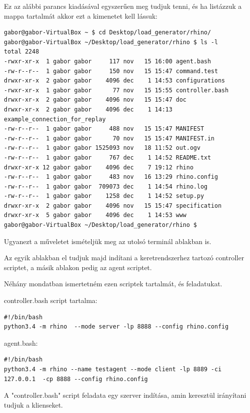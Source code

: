 \documentclass[a4paper,12pt,oneside]{report}
\begin{document}
\begin{enumerate}
Ez az alábbi parancs kiadásával egyszerűen meg tudjuk tenni, és ha listázzuk a mappa tartalmát akkor ezt a kimenetet kell lássuk:

\begin{lstlisting}
gabor@gabor-VirtualBox ~ $ cd Desktop/load_generator/rhino/
gabor@gabor-VirtualBox ~/Desktop/load_generator/rhino $ ls -l
total 2248
-rwxr-xr-x  1 gabor gabor     117 nov   15 16:00 agent.bash
-rw-r--r--  1 gabor gabor     150 nov   15 15:47 command.test
drwxr-xr-x  2 gabor gabor    4096 dec    1 14:53 configurations
-rwxr-xr-x  1 gabor gabor      77 nov   15 15:55 controller.bash
drwxr-xr-x  2 gabor gabor    4096 nov   15 15:47 doc
drwxr-xr-x  2 gabor gabor    4096 dec    1 14:13 example_connection_for_replay
-rw-r--r--  1 gabor gabor     488 nov   15 15:47 MANIFEST
-rw-r--r--  1 gabor gabor      70 nov   15 15:47 MANIFEST.in
-rw-r--r--  1 gabor gabor 1525093 nov   18 11:52 out.ogv
-rw-r--r--  1 gabor gabor     767 dec    1 14:52 README.txt
drwxr-xr-x 12 gabor gabor    4096 dec    7 19:12 rhino
-rw-r--r--  1 gabor gabor     483 nov   16 13:29 rhino.config
-rw-r--r--  1 gabor gabor  709073 dec    1 14:54 rhino.log
-rw-r--r--  1 gabor gabor    1258 dec    1 14:52 setup.py
drwxr-xr-x  2 gabor gabor    4096 nov   15 15:47 specification
drwxr-xr-x  5 gabor gabor    4096 dec    1 14:53 www
gabor@gabor-VirtualBox ~/Desktop/load_generator/rhino $

\end{lstlisting}

Ugyanezt a műveletet ismételjük meg az utolsó terminál ablakban is.

Az egyik ablakban el tudjuk majd indítani a keretrendszerhez tartozó controller scriptet, a másik ablakon pedig az agent scriptet.

Néhány mondatban ismertetném ezen scriptek tartalmát, és feladatukat.

controller.bash script tartalma:
\begin{lstlisting}
#!/bin/bash
python3.4 -m rhino  --mode server -lp 8888 --config rhino.config
\end{lstlisting}

agent.bash:
\begin{lstlisting}
#!/bin/bash
python3.4 -m rhino --name testagent --mode client -lp 8889 -ci 127.0.0.1  -cp 8888 --config rhino.config
\end{lstlisting}

A "controller.bash" script feladata egy szerver indítása, amin keresztül irányítani tudjuk a klienseket.


\end{enumerate}
\end{document}
